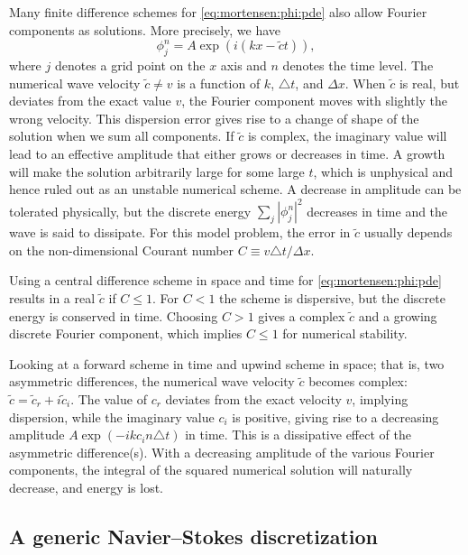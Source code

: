 Many finite difference schemes for \eqref{eq:mortensen:phi:pde} also
allow Fourier components as solutions. More precisely, we have
\begin{equation}
   \phi_j^n = A\exp{(i(kx - \tilde c t))},
\end{equation}
where $j$ denotes a grid point on the $x$ axis and $n$ denotes the time
level.  The numerical wave velocity $\tilde c \neq v$ is a function of
$k$, $\triangle t$, and $\Delta x$.  When $\tilde c$ is real, but deviates
from the exact value $v$, the Fourier component moves with slightly the
wrong velocity. This dispersion error gives rise to a change of shape
of the solution when we sum all components.  If $\tilde c$ is complex,
the imaginary value will lead to an effective amplitude that either
grows or decreases in time. A growth will make the solution arbitrarily
large for some large $t$, which is unphysical and hence ruled out as an
unstable numerical scheme.  A decrease in amplitude can be tolerated
physically, but the discrete energy $\sum_j |\phi_j^n|^2$ decreases
in time and the wave is said to dissipate.  For this model problem,
the error in $\tilde c$ usually depends on the non-dimensional Courant
number $C\equiv v\triangle t/\Delta x$.

Using a central difference scheme in space and time for
\eqref{eq:mortensen:phi:pde} results in a real $\tilde c$ if $C\leqslant
1$. For $C<1$ the scheme is dispersive, but the discrete energy is
conserved in time.  Choosing $C>1$ gives a complex $\tilde c$ and a
growing discrete Fourier component, which implies $C\leqslant1$ for
numerical stability.

Looking at a forward scheme in time and upwind scheme in space; that
is, two asymmetric differences, the numerical wave velocity $\tilde c$
becomes complex: $\tilde c = \tilde c_r + i\tilde c_i$.  The value
of $c_r$ deviates from the exact velocity $v$, implying dispersion,
while the imaginary value $c_i$ is positive, giving rise to a decreasing
amplitude $A\exp{(-ikc_i n\triangle t)}$ in time.  This is a dissipative
effect of the asymmetric difference(s).  With a decreasing amplitude of
the various Fourier components, the integral of the squared numerical
solution will naturally decrease, and energy is lost.

\subsection{A generic Navier--Stokes discretization}
\label{sec:mortensen:NS-solver}

